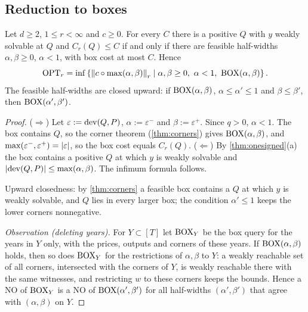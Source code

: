 \subsection{Reduction to boxes}
\begin{theorem}[reduction]\label{thm:reduction}
Let $d\ge2$, $1\le r<\infty$ and $c\ge0$. For every $C$ there is a positive $Q$ with $y$ weakly solvable at $Q$ and $C_r(Q)\le C$ if and only if there are feasible half-widths $\alpha,\beta\ge0$, $\alpha<1$, with box cost at most $C$. Hence
\[
\OPT_r=\inf\set{\norm{c\circ\max(\alpha,\beta)}_r\mid\alpha,\beta\ge0,\ \alpha<1,\ \BOX(\alpha,\beta)}.
\]
The feasible half-widths are closed upward: if $\mathrm{BOX}(\alpha,\beta)$, $\alpha\le\alpha'\le1$ and $\beta\le\beta'$, then $\mathrm{BOX}(\alpha',\beta')$.
\end{theorem}
\begin{proof}
($\Rightarrow$) Let $\varepsilon:=\operatorname{dev}(Q,P)$, $\alpha:=\varepsilon^-$ and $\beta:=\varepsilon^+$. Since $q>0$, $\alpha<1$. The box contains $Q$, so the corner theorem (\cref{thm:corners}) gives $\mathrm{BOX}(\alpha,\beta)$, and $\max(\varepsilon^-,\varepsilon^+)=\left\lvert \varepsilon \right\rvert$, so the box cost equals $C_r(Q)$. ($\Leftarrow$) By \cref{thm:onesigned}(a) the box contains a positive $Q$ at which $y$ is weakly solvable and $\left\lvert \operatorname{dev}(Q,P) \right\rvert\le\max(\alpha,\beta)$. The infimum formula follows.

Upward closedness: by \cref{thm:corners} a feasible box contains a $Q$ at which $y$ is weakly solvable, and $Q$ lies in every larger box; the condition $\alpha'\le1$ keeps the lower corners nonnegative.

\emph{Observation (deleting years).} For $Y\subset[T]$ let $\mathrm{BOX}_Y$ be the box query for the years in $Y$ only, with the prices, outputs and corners of these years. If $\mathrm{BOX}(\alpha,\beta)$ holds, then so does $\mathrm{BOX}_Y$ for the restrictions of $\alpha,\beta$ to $Y$: a weakly reachable set of all corners, intersected with the corners of $Y$, is weakly reachable there with the same witnesses, and restricting $w$ to these corners keeps the bounds. Hence a NO of $\mathrm{BOX}_Y$ is a NO of $\mathrm{BOX}(\alpha',\beta')$ for all half-widths $(\alpha',\beta')$ that agree with $(\alpha,\beta)$ on $Y$.
\end{proof}

